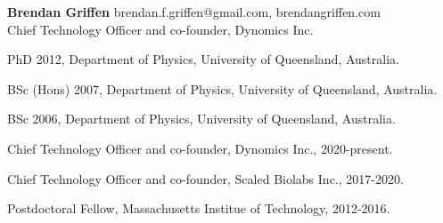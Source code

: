 \documentclass[12pt,letterpaper]{article}
\begin{document}
\thispagestyle{empty}\sloppy\sloppypar\raggedbottom

\textbf{\Large Brendan Griffen} \hfill
\textsf{\small brendan.f.griffen@gmail.com, brendangriffen.com} \\[0.5ex]
Chief Technology Officer and co-founder, Dynomics Inc.\\[0.5ex]

\begin{list}{}{\cvlist}
  \item
        PhD 2012,  Department of Physics, University of Queensland, Australia.
  \item
        BSc (Hons) 2007, Department of Physics, University of Queensland, Australia.
  \item
        BSc 2006, Department of Physics, University of Queensland, Australia.
\end{list}


\begin{list}{}{\cvlist}
  \item
        Chief Technology Officer and co-founder, Dynomics Inc., 2020-present.
  \item
        Chief Technology Officer and co-founder, Scaled Biolabs Inc., 2017-2020.
  \item
        Postdoctoral Fellow, Massachusetts Institue of Technology, 2012-2016.
\end{list}


\ifdefined\withpubs
  

  \begin{list}{}{\cvlist}
    
  \end{list}

\fi
\end{document}
